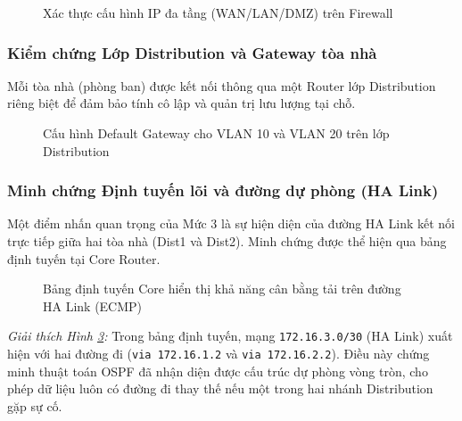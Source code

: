 \begin{figure}[H]
    \centering
    \caption{Xác thực cấu hình IP đa tầng (WAN/LAN/DMZ) trên Firewall}
    \label{fig:fw_ip}
\end{figure}

\subsubsection{Kiểm chứng Lớp Distribution và Gateway tòa nhà}
Mỗi tòa nhà (phòng ban) được kết nối thông qua một Router lớp Distribution riêng biệt để đảm bảo tính cô lập và quản trị lưu lượng tại chỗ.

\begin{figure}[H]
    \centering
    \caption{Cấu hình Default Gateway cho VLAN 10 và VLAN 20 trên lớp Distribution}
    \label{fig:dist_gw}
\end{figure}

\subsubsection{Minh chứng Định tuyến lõi và đường dự phòng (HA Link)}
Một điểm nhấn quan trọng của Mức 3 là sự hiện diện của đường HA Link kết nối trực tiếp giữa hai tòa nhà (Dist1 và Dist2). Minh chứng được thể hiện qua bảng định tuyến tại Core Router.

\begin{figure}[H]
    \centering
    \caption{Bảng định tuyến Core hiển thị khả năng cân bằng tải trên đường HA Link (ECMP)}
    \label{fig:ha_route}
\end{figure}

\textit{Giải thích Hình \ref{fig:ha_route}:} Trong bảng định tuyến, mạng \texttt{172.16.3.0/30} (HA Link) xuất hiện với hai đường đi (\texttt{via 172.16.1.2} và \texttt{via 172.16.2.2}). Điều này chứng minh thuật toán OSPF đã nhận diện được cấu trúc dự phòng vòng tròn, cho phép dữ liệu luôn có đường đi thay thế nếu một trong hai nhánh Distribution gặp sự cố.

